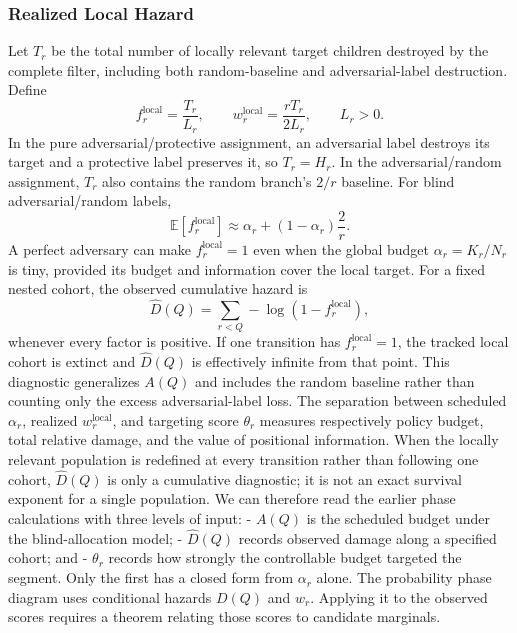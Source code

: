 \subsubsection*{Realized Local Hazard}
Let $T_r$ be the total number of locally relevant target children destroyed by the complete filter, including both random-baseline and adversarial-label destruction. Define
\begin{equation*}
f_r^{\mathrm{local}}=\frac{T_r}{L_r},
\qquad
w_r^{\mathrm{local}}=\frac{rT_r}{2L_r},
\qquad L_r > 0.
\end{equation*}
In the pure adversarial/protective assignment, an adversarial label destroys its target and a protective label preserves it, so $T_r=H_r$. In the adversarial/random assignment, $T_r$ also contains the random branch's $2/r$ baseline. For blind adversarial/random labels,
\begin{equation*}
\mathbb E[f_r^{\mathrm{local}}]
\approx
\alpha_r+(1-\alpha_r)\frac2r.
\end{equation*}
A perfect adversary can make $f_r^{\mathrm{local}}=1$ even when the global budget $\alpha_r=K_r/N_r$ is tiny, provided its budget and information cover the local target.
For a fixed nested cohort, the observed cumulative hazard is
\begin{equation*}
\widehat D(Q)
=
\sum_{r < Q}-\log\left(1-f_r^{\mathrm{local}}\right),
\end{equation*}
whenever every factor is positive. If one transition has $f_r^{\mathrm{local}}=1$, the tracked local cohort is extinct and $\widehat D(Q)$ is effectively infinite from that point. This diagnostic generalizes $A(Q)$ and includes the random baseline rather than counting only the excess adversarial-label loss. The separation between scheduled $\alpha_r$, realized $w_r^{\mathrm{local}}$, and targeting score $\theta_r$ measures respectively policy budget, total relative damage, and the value of positional information.
When the locally relevant population is redefined at every transition rather than following one cohort, $\widehat D(Q)$ is only a cumulative diagnostic; it is not an exact survival exponent for a single population.
We can therefore read the earlier phase calculations with three levels of input:
- $A(Q)$ is the scheduled budget under the blind-allocation model; - $\widehat D(Q)$ records observed damage along a specified cohort; and - $\theta_r$ records how strongly the controllable budget targeted the segment.
Only the first has a closed form from $\alpha_r$ alone. The probability phase diagram uses conditional hazards $D(Q)$ and $w_r$. Applying it to the observed scores requires a theorem relating those scores to candidate marginals.
